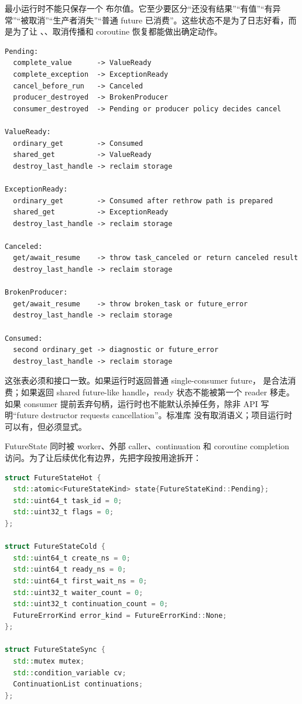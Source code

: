 最小运行时不能只保存一个  布尔值。它至少要区分“还没有结果”“有值”“有异常”“被取消”“生产者消失”“普通 future 已消费”。这些状态不是为了日志好看，而是为了让 、、取消传播和 coroutine 恢复都能做出确定动作。

\begin{lstlisting}[numbers=none,caption={FutureState 状态转移表}]
Pending:
  complete_value      -> ValueReady
  complete_exception  -> ExceptionReady
  cancel_before_run   -> Canceled
  producer_destroyed  -> BrokenProducer
  consumer_destroyed  -> Pending or producer policy decides cancel

ValueReady:
  ordinary_get        -> Consumed
  shared_get          -> ValueReady
  destroy_last_handle -> reclaim storage

ExceptionReady:
  ordinary_get        -> Consumed after rethrow path is prepared
  shared_get          -> ExceptionReady
  destroy_last_handle -> reclaim storage

Canceled:
  get/await_resume    -> throw task_canceled or return canceled result
  destroy_last_handle -> reclaim storage

BrokenProducer:
  get/await_resume    -> throw broken_task or future_error
  destroy_last_handle -> reclaim storage

Consumed:
  second ordinary_get -> diagnostic or future_error
  destroy_last_handle -> reclaim storage
\end{lstlisting}

这张表必须和接口一致。如果运行时返回普通 single-consumer future， 是合法消费；如果返回 shared future-like handle，ready 状态不能被第一个 reader 移走。如果 consumer 提前丢弃句柄，运行时也不能默认杀掉任务，除非 API 写明“future destructor requests cancellation”。标准库  没有取消语义；项目运行时可以有，但必须显式。

FutureState 同时被 worker、外部 caller、continuation 和 coroutine completion 访问。为了让后续优化有边界，先把字段按用途拆开：

\begin{lstlisting}[language=C++,caption={FutureState 的语义布局}]
struct FutureStateHot {
  std::atomic<FutureStateKind> state{FutureStateKind::Pending};
  std::uint64_t task_id = 0;
  std::uint32_t flags = 0;
};

struct FutureStateCold {
  std::uint64_t create_ns = 0;
  std::uint64_t ready_ns = 0;
  std::uint64_t first_wait_ns = 0;
  std::uint32_t waiter_count = 0;
  std::uint32_t continuation_count = 0;
  FutureErrorKind error_kind = FutureErrorKind::None;
};

struct FutureStateSync {
  std::mutex mutex;
  std::condition_variable cv;
  ContinuationList continuations;
};
\end{lstlisting}

